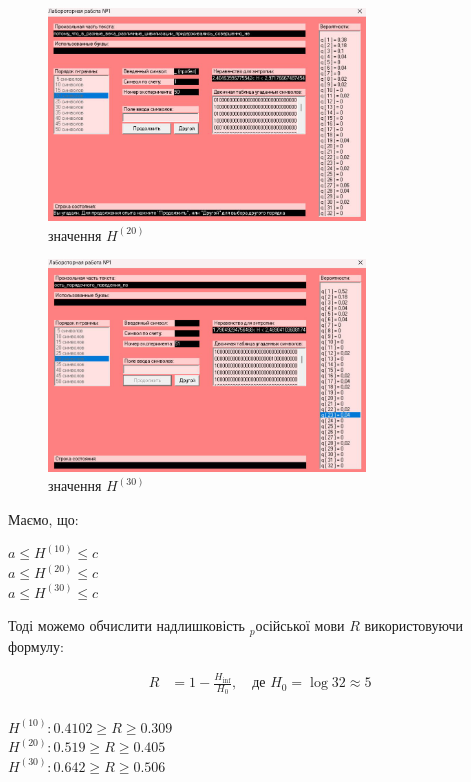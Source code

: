 \documentclass[12pt]{article}
\begin{document}
\begin{figure}[htbp]
    \centering
    \includegraphics[width=0.75\textwidth]{screenshots/h20.png}
    \caption{значення \(H^{(20)}\)}
    \label{fig:screenshot}
\end{figure}

\begin{figure}[htbp]
    \centering
    \includegraphics[width=0.75\textwidth]{screenshots/h30.png}
    \caption{значення \(H^{(30)}\)}
    \label{fig:screenshot}
\end{figure}

\newpage
\quad Маємо, що:\\
\begin{center}
$a \leq H^{(10)} \leq c$ \\
$a \leq H^{(20)} \leq c$ \\
$a \leq H^{(30)} \leq c$ \\
\end{center}

Тоді можемо обчислити надлишковість $_{p}$осійської мови \( R \) використовуючи формулу: 

\begin{align*}
R &= 1 - \frac{H_{\text{inf}}}{H_0},
\quad \text{де } H_0 = \log 32 \approx 5 \\
\end{align*}

\begin{center}
$H^{(10)}: 0.4102 \geq R \geq 0.309$ \\
$H^{(20)}: 0.519 \geq R \geq 0.405$ \\
$H^{(30)}: 0.642 \geq R \geq 0.506$ \\
\end{center}
\end{document}
